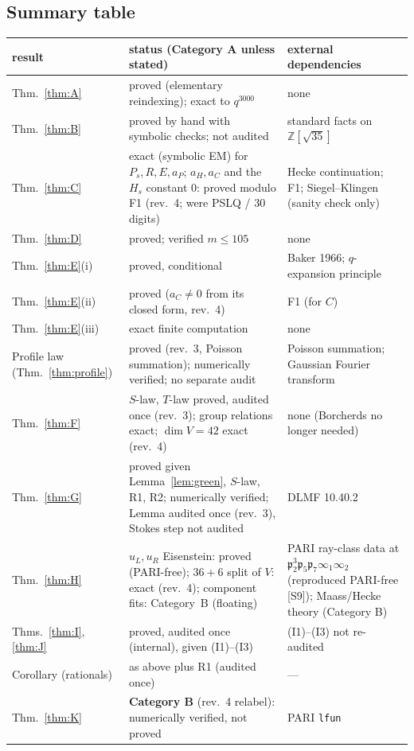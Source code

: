 \documentclass[11pt]{article}
\theoremstyle{definition}
\theoremstyle{plain}
\newcommand{\Z}{\mathbb{Z}}
\newcommand{\fp}{\mathfrak{p}}
\newcommand{\src}[1]{\textup{[S#1]}}
\begin{document}
\subsection{Summary table}
\begin{center}\small
\begin{longtable}{p{2.6cm}p{6.6cm}p{5.6cm}}\toprule
result & status (Category A unless stated) & external dependencies\\\midrule\endhead
Thm.~\ref{thm:A} & proved (elementary reindexing); exact to $q^{3000}$ & none\\
Thm.~\ref{thm:B} & proved by hand with symbolic checks; not audited & standard facts on $\Z[\sqrt{35}]$\\
Thm.~\ref{thm:C} & exact (symbolic EM) for $P_s,R,E,a_P$; $a_H,a_C$ and the $H_s$ constant $0$: proved modulo F1 (rev.~4; were PSLQ / 30 digits) & Hecke continuation; F1; Siegel--Klingen (sanity check only)\\
Thm.~\ref{thm:D} & proved; verified $m\le105$ & none\\
Thm.~\ref{thm:E}(i) & proved, conditional & Baker 1966; $q$-expansion principle\\
Thm.~\ref{thm:E}(ii) & proved ($a_C\neq0$ from its closed form, rev.~4) & F1 (for $C$)\\
Thm.~\ref{thm:E}(iii) & exact finite computation & none\\
Profile law (Thm.~\ref{thm:profile}) & proved (rev.~3, Poisson summation); numerically verified; no separate audit & Poisson summation; Gaussian Fourier transform\\
Thm.~\ref{thm:F} & $S$-law, $T$-law proved, audited once (rev.~3); group relations exact; $\dim V=42$ exact (rev.~4) & none (Borcherds no longer needed)\\
Thm.~\ref{thm:G} & proved given Lemma~\ref{lem:green}, $S$-law, R1, R2; numerically verified; Lemma audited once (rev.~3), Stokes step not audited & DLMF 10.40.2\\
Thm.~\ref{thm:H} & $u_L,u_R$ Eisenstein: proved (PARI-free); $36+6$ split of $V$: exact (rev.~4); component fits: Category~B (floating) & PARI ray-class data at $\fp_2^3\fp_5\fp_7\infty_1\infty_2$ (reproduced PARI-free \src{9}); Maass/Hecke theory (Category B)\\
Thms.~\ref{thm:I}, \ref{thm:J} & proved, audited once (internal), given (I1)--(I3) & (I1)--(I3) not re-audited\\
Corollary (rationals) & as above plus R1 (audited once) & ---\\
Thm.~\ref{thm:K} & \textbf{Category B} (rev.~4 relabel): numerically verified, not proved & PARI \texttt{lfun}\\

\end{longtable}
\end{center}
\end{document}
